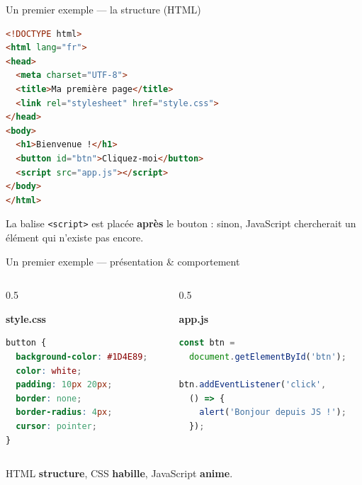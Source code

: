 \documentclass[aspectratio=169,11pt]{beamer}
\begin{document}
\begin{frame}[fragile]{Un premier exemple --- la structure (HTML)}
\begin{lstlisting}[language=HTML]
<!DOCTYPE html>
<html lang="fr">
<head>
  <meta charset="UTF-8">
  <title>Ma première page</title>
  <link rel="stylesheet" href="style.css">
</head>
<body>
  <h1>Bienvenue !</h1>
  <button id="btn">Cliquez-moi</button>
  <script src="app.js"></script>
</body>
</html>
\end{lstlisting}
  \vspace{0.2cm}
  \begin{center}
    \small La balise \texttt{<script>} est placée \textbf{après} le bouton : sinon, JavaScript chercherait un élément qui n'existe pas encore.
  \end{center}
\end{frame}

\begin{frame}[fragile]{Un premier exemple --- présentation \& comportement}
  \begin{columns}[T]
    \begin{column}{0.5\textwidth}
      \begin{center}\footnotesize\textbf{style.css}\end{center}
\begin{lstlisting}[language=CSS]
button {
  background-color: #1D4E89;
  color: white;
  padding: 10px 20px;
  border: none;
  border-radius: 4px;
  cursor: pointer;
}
\end{lstlisting}
    \end{column}
    \begin{column}{0.5\textwidth}
      \begin{center}\footnotesize\textbf{app.js}\end{center}
\begin{lstlisting}[language=JavaScript]
const btn =
  document.getElementById('btn');

btn.addEventListener('click',
  () => {
    alert('Bonjour depuis JS !');
  });
\end{lstlisting}
    \end{column}
  \end{columns}
  \vspace{0.3cm}
  \begin{center}
    \small HTML \textbf{structure}, CSS \textbf{habille}, JavaScript \textbf{anime}.
  \end{center}
\end{frame}
\end{document}
